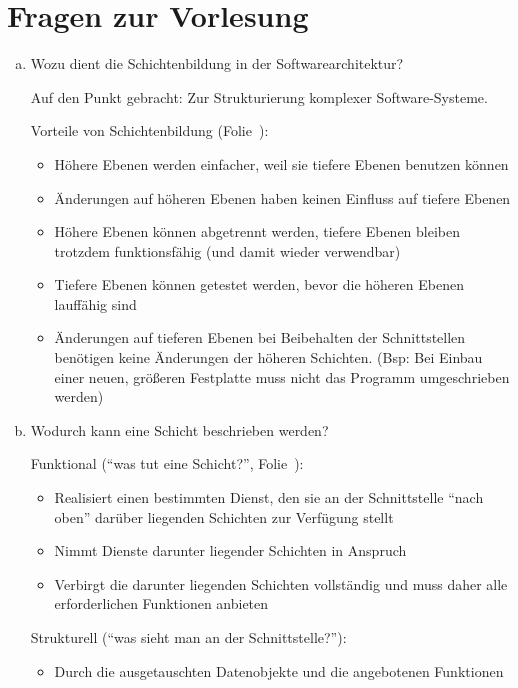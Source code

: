 \section{Fragen zur Vorlesung}
\begin{enumerate}[a)]
	\item Wozu dient die Schichtenbildung in der Softwarearchitektur?

	\begin{solution}
	Auf den Punkt gebracht: Zur Strukturierung komplexer Software-Systeme.

	Vorteile von Schichtenbildung (Folie~\SchichteVorteil):
	\begin{itemize}
		\item Höhere Ebenen werden einfacher, weil sie tiefere Ebenen benutzen können
		\item Änderungen auf höheren Ebenen haben keinen Einfluss auf tiefere Ebenen
		\item Höhere Ebenen können abgetrennt werden, tiefere Ebenen bleiben trotzdem funktionsfähig (und damit wieder verwendbar)
		\item Tiefere Ebenen können getestet werden, bevor die höheren Ebenen lauffähig sind
		\item Änderungen auf tieferen Ebenen bei Beibehalten der Schnittstellen benötigen keine Änderungen der höheren Schichten.
		(Bsp: Bei Einbau einer neuen, größeren Festplatte muss nicht das Programm umgeschrieben werden)
	\end{itemize}
	\end{solution}


	\item Wodurch kann eine Schicht beschrieben werden?

	\begin{solution}
	Funktional ("`was tut eine Schicht?"', Folie~\SchichteAufgabe):
	\begin{itemize}
		\item Realisiert einen bestimmten Dienst, den sie an der Schnittstelle "`nach oben"' darüber liegenden Schichten zur Verfügung stellt
		\item Nimmt Dienste darunter liegender Schichten in Anspruch
		\item Verbirgt die darunter liegenden Schichten vollständig und muss daher alle erforderlichen Funktionen anbieten
	\end{itemize}

	Strukturell ("`was sieht man an der Schnittstelle?"'):
	\begin{itemize}
		\item Durch die ausgetauschten Datenobjekte und die angebotenen Funktionen
	\end{itemize}
	\end{solution}



\end{enumerate}
